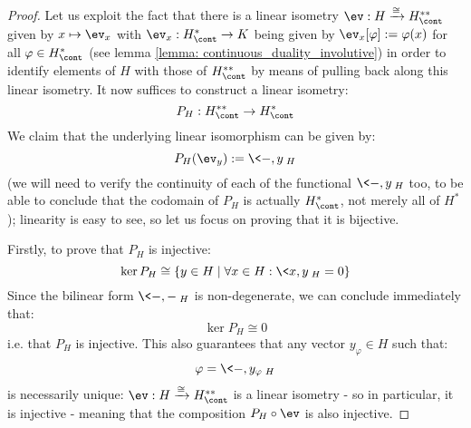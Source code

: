             \begin{proof}
                Let us exploit the fact that there is a linear isometry $\ev: H \xrightarrow[]{\cong} H^{**}_{\cont}$ given by $x \mapsto \ev_x$ with $\ev_x: H^*_{\cont} \to K$ being given by $\ev_x[\varphi] := \varphi(x)$ for all $\varphi \in H^*_{\cont}$ (see lemma \ref{lemma: continuous_duality_involutive}) in order to identify elements of $H$ with those of $H^{**}_{\cont}$ by means of pulling back along this linear isometry. It now suffices to construct a linear isometry:
                    $$P_H: H^{**}_{\cont} \to H^*_{\cont}$$
                We claim that the underlying linear isomorphism can be given by:
                    $$P_H(\ev_y) := \<-, y\>_H$$
                (we will need to verify the continuity of each of the functional $\<-, y\>_H$ too, to be able to conclude that the codomain of $P_H$ is actually $H^*_{\cont}$, not merely all of $H^*$); linearity is easy to see, so let us focus on proving that it is bijective.
                
                Firstly, to prove that $P_H$ is injective:
                    $$\ker P_H \cong \{ y \in H \mid \forall x \in H: \<x, y\>_H = 0 \}$$
                Since the bilinear form $\<-, -\>_H$ is non-degenerate, we can conclude immediately that:
                    $$\ker P_H \cong 0$$
                i.e. that $P_H$ is injective. This also guarantees that any vector $y_{\varphi} \in H$ such that:
                    $$\varphi = \<-, y_{\varphi}\>_H$$
                is necessarily unique: $\ev: H \xrightarrow[]{\cong} H^{**}_{\cont}$ is a linear isometry - so in particular, it is injective - meaning that the composition $P_H \circ \ev$ is also injective.
                

\end{proof}
